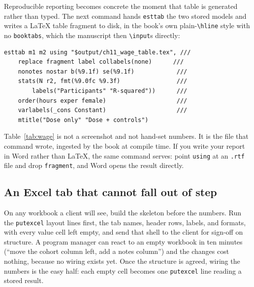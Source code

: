 \documentclass[
    a4paper,
    fontsize=10pt,
    twoside=true,
    numbers=noenddot,
]{kaobook}
\begin{document}
Reproducible reporting becomes concrete the moment that table is generated rather than typed. The next command hands \texttt{esttab} the two stored models and writes a \LaTeX{} table fragment to disk, in the book's own plain-\texttt{\textbackslash hline} style with no \texttt{booktabs}, which the manuscript then \texttt{\textbackslash input}s directly:
\par
{\footnotesize
\begin{verbatim}
esttab m1 m2 using "$output/ch11_wage_table.tex", ///
    replace fragment label collabels(none)      ///
    nonotes nostar b(%9.1f) se(%9.1f)            ///
    stats(N r2, fmt(%9.0fc %9.3f)                ///
        labels("Participants" "R-squared"))      ///
    order(hours exper female)                    ///
    varlabels(_cons Constant)                    ///
    mtitle("Dose only" "Dose + controls")
\end{verbatim}
}
Table~\ref{tab:wage} is not a screenshot and not hand-set numbers. It is the file that command wrote, ingested by the book at compile time. If you write your report in Word rather than \LaTeX{}, the same command serves: point \texttt{using} at an \texttt{.rtf} file and drop \texttt{fragment}, and Word opens the result directly.

\begin{table}[htbp]
\centering
\caption[Reproducible earnings table, ingested from a do-file]{Program earnings model for a simulated workforce cohort (seed \texttt{20260704}). OLS coefficients with standard errors in parentheses; earnings are dollars per quarter. \textbf{This table is not typed:} \texttt{ch11\_tables.do} estimated the two models and wrote this exact \texttt{tabular} with \texttt{esttab}; the book ingests it with \texttt{\textbackslash input\{ch11\_wage\_table.tex\}}. Rerun the do-file and the numbers here update on the next compile.}
\label{tab:wage}

\end{table}


\subsection{An Excel tab that cannot fall out of step}\label{sec:ch11-excel-tab}
On any workbook a client will see, build the skeleton before the numbers. Run the \texttt{putexcel} layout lines first, the tab names, header rows, labels, and formats, with every value cell left empty, and send that shell to the client for sign-off on structure. A program manager can react to an empty workbook in ten minutes (\enquote{move the cohort column left, add a notes column}) and the changes cost nothing, because no wiring exists yet. Once the structure is agreed, wiring the numbers is the easy half: each empty cell becomes one \texttt{putexcel} line reading a stored result.
\end{document}
